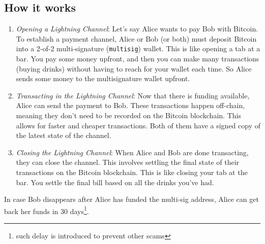 \subsection{How it works}
\begin{enumerate}


   \item \textit{Opening a Lightning Channel}:
   Let's say Alice wants to pay Bob with Bitcoin. To establish a payment channel, Alice or Bob (or both) must deposit Bitcoin into a 2-of-2 multi-signature (\texttt{multisig}) wallet. This is like opening a tab at a bar. You pay some money upfront, and then you can make many transactions (buying drinks) without having to reach for your wallet each time.
   So Alice sends some money to the multisignature wallet upfront.

   \item \textit{Transacting in the Lightning Channel}:
   Now that there is funding available, Alice can send the payment to Bob. These transactions happen off-chain, meaning they don't need to be recorded on the Bitcoin blockchain. This allows for faster and cheaper transactions.
   Both of them have a signed copy of the latest state of the channel.

   \item \textit{Closing the Lightning Channel}:
   When Alice and Bob are done transacting, they can close the channel. This involves settling the final state of their transactions on the Bitcoin blockchain. This is like closing your tab at the bar. You settle the final bill based on all the drinks you've had.

\end{enumerate}

In case Bob disappears after Alice has funded the multi-sig address, Alice can get back her funds in 30 days\footnote{such delay is introduced to prevent other scams}.


